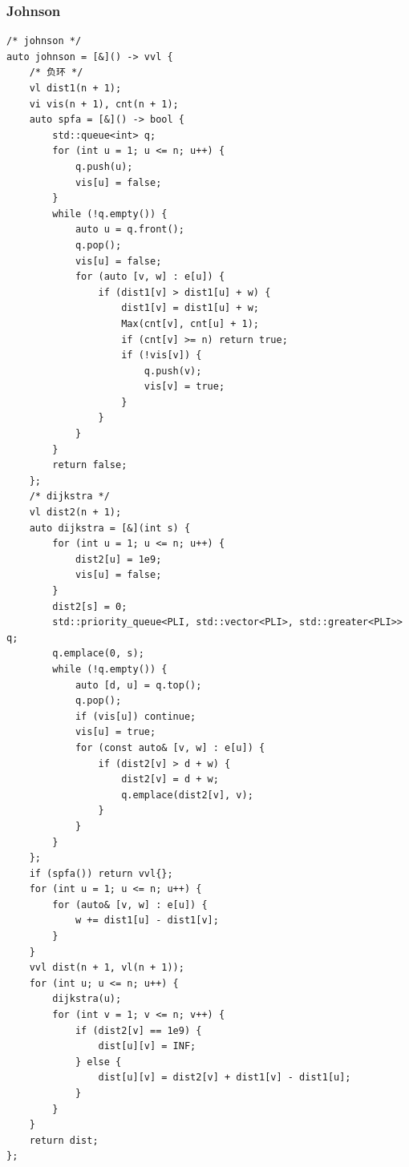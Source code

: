 \documentclass[UTF8, a4paper, titlepage, twoside]{ctexart}
\begin{document}
\subsubsection*{ Johnson }
\begin{lstlisting}[style=cpp]
/* johnson */
auto johnson = [&]() -> vvl {
    /* 负环 */
    vl dist1(n + 1);
    vi vis(n + 1), cnt(n + 1);
    auto spfa = [&]() -> bool {
        std::queue<int> q;
        for (int u = 1; u <= n; u++) {
            q.push(u);
            vis[u] = false;
        }
        while (!q.empty()) {
            auto u = q.front();
            q.pop();
            vis[u] = false;
            for (auto [v, w] : e[u]) {
                if (dist1[v] > dist1[u] + w) {
                    dist1[v] = dist1[u] + w;
                    Max(cnt[v], cnt[u] + 1);
                    if (cnt[v] >= n) return true;
                    if (!vis[v]) {
                        q.push(v);
                        vis[v] = true;
                    }
                }
            }
        }
        return false;
    };
    /* dijkstra */
    vl dist2(n + 1);
    auto dijkstra = [&](int s) {
        for (int u = 1; u <= n; u++) {
            dist2[u] = 1e9;
            vis[u] = false;
        }
        dist2[s] = 0;
        std::priority_queue<PLI, std::vector<PLI>, std::greater<PLI>> q;
        q.emplace(0, s);
        while (!q.empty()) {
            auto [d, u] = q.top();
            q.pop();
            if (vis[u]) continue;
            vis[u] = true;
            for (const auto& [v, w] : e[u]) {
                if (dist2[v] > d + w) {
                    dist2[v] = d + w;
                    q.emplace(dist2[v], v);
                }
            }
        }
    };
    if (spfa()) return vvl{};
    for (int u = 1; u <= n; u++) {
        for (auto& [v, w] : e[u]) {
            w += dist1[u] - dist1[v];
        }
    }
    vvl dist(n + 1, vl(n + 1));
    for (int u; u <= n; u++) {
        dijkstra(u);
        for (int v = 1; v <= n; v++) {
            if (dist2[v] == 1e9) {
                dist[u][v] = INF;
            } else {
                dist[u][v] = dist2[v] + dist1[v] - dist1[u];
            }
        }
    }
    return dist;
};
\end{lstlisting}
\end{document}
